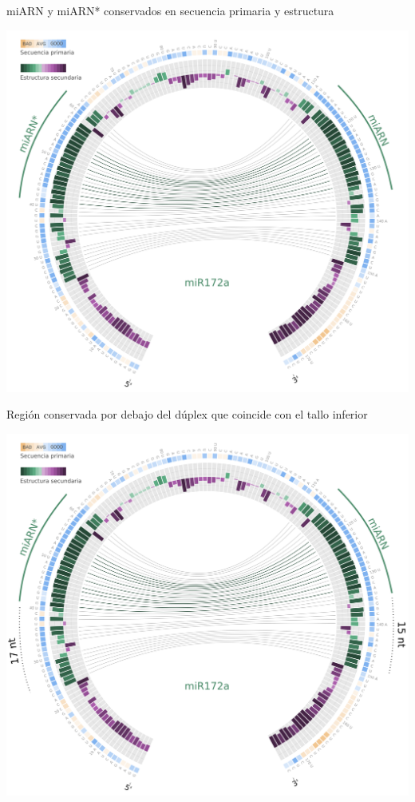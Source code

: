 \documentclass{beamer}
\begin{document}
\begin{frame}{miARN y miARN* conservados en secuencia primaria y estructura}
	\begin{center}
		\includegraphics[width=.8\textwidth]{img/miR172a_circos04.png}
	\end{center}
\end{frame}

\begin{frame}{Región conservada por debajo del dúplex que coincide con el tallo inferior}
	\begin{center}
		\includegraphics[width=.8\textwidth]{img/miR172a_circos05.png}
	\end{center}
\end{frame}
\end{document}

